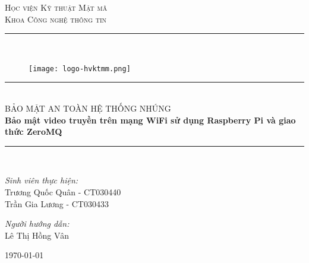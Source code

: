 \documentclass{article}
\newcommand\HRule{\rule{\textwidth}{1pt}}
\begin{document}
\begin{titlepage}


\begin{center}
{
\textsc{\Large Học viện Kỹ thuật Mật mã}\\
\textsc{\Large Khoa Công nghệ thông tin}\\
\HRule \\[0.4cm]
\begin{figure}[h]
\centering
\texttt{[image: logo-hvktmm.png]}
\label{school-logo}
\end{figure}
\HRule \\[0.4cm]
\textsc{\Large BẢO MẬT AN TOÀN HỆ THỐNG NHÚNG}\\[1cm]
{ \huge \bfseries Bảo mật video truyền trên mạng WiFi sử dụng Raspberry Pi và giao thức ZeroMQ
}\\[0.4cm]
\HRule \\[3cm]
\begin{minipage}{0.5\textwidth}
\begin{flushleft} \large
\emph{Sinh viên thực hiện:}\\
Trương Quốc Quân - CT030440
\\
Trần Gia Lương - CT030433
\break
\end{flushleft}
\end{minipage}
\begin{minipage}{0.45\textwidth}
\begin{flushright} \large
\emph{Người hướng dẫn:} \\
Lê Thị Hồng Vân
\break \break
\end{flushright}
\end{minipage}

\vfill

{\large \today}
}
\end{center}
\end{titlepage}

\fontsize{12}{10}
\selectfont

\tableofcontents

\newpage

\listoffigures
\newpage

\listoftables
\newpage
\end{document}

